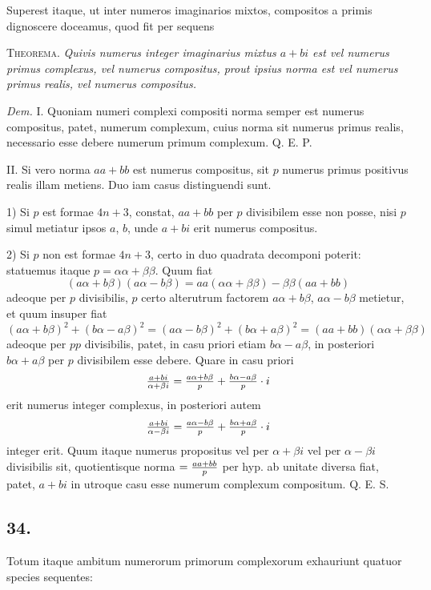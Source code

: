 \documentclass[twoside,12pt]{memoir}
\let\oldfrac\frac
\def\frac#1#2{\mathchoice{\tfrac{#1}{#2}}{\oldfrac{#1}{#2}}{\genfrac{}{}{}{2}{#1}{#2\mathstrut}}{\genfrac{}{}{}{3}{#1}{#2\mathstrut}}}
\begin{document}
Superest itaque, ut inter numeros imaginarios mixtos, compositos a primis dignoscere doceamus, quod fit per sequens
 
\textsc{Theorema.} \textit{Quivis numerus integer imaginarius mixtus \(a+b i\) est vel numerus primus complexus, vel numerus compositus, prout ipsius norma est vel numerus primus realis, vel numerus compositus.}
 
\textit{Dem.} I. Quoniam numeri complexi compositi norma semper est numerus compositus, patet, numerum complexum, cuius norma sit numerus primus realis, necessario esse debere numerum primum complexum. Q. E. P.
 
II. Si vero norma \(a a+b b\) est numerus compositus, sit \(p\) numerus primus positivus realis illam metiens. Duo iam casus distinguendi sunt.
 
1) Si \(p\) est formae \(4 n+3\), constat, \(a a+b b\) per \(p\) divisibilem esse non posse, nisi \(p\) simul metiatur ipsos \(a\), \(b\), unde \(a+b i\) erit numerus compositus.
 
2) Si \(p\) non est formae \(4 n+3\), certo in duo quadrata decomponi poterit: statuemus itaque \(p=\alpha \alpha+\beta \beta\). Quum fiat
\[(a \alpha+b \beta)(a \alpha-b \beta)=a a(\alpha \alpha+\beta \beta)-\beta \beta(a a+b b)\]
adeoque per \(p\) divisibilis, \(p\) certo alterutrum factorem \(a \alpha+b \beta\), \(a \alpha-b \beta\) metietur, et quum insuper fiat
\[(a \alpha+b \beta)^{2}+(b \alpha-a \beta)^{2}=(a \alpha-b \beta)^{2}+(b \alpha+a \beta)^{2}=(a a+b b)(\alpha \alpha+\beta \beta)\]
adeoque per \(p p\) divisibilis, patet, in casu priori etiam \(b \alpha-a \beta\), in posteriori \(b \alpha+a \beta\) per \(p\) divisibilem esse debere. Quare in casu priori
\[\frac{a+b i}{\alpha+\beta i}=\frac{a \alpha+b \beta}{p}+\frac{b \alpha-a \beta}{p} \cdot i\]
erit numerus integer complexus, in posteriori autem
\[\frac{a+b i}{\alpha-\beta i}=\frac{a \alpha-b \beta}{p}+\frac{b \alpha+a \beta}{p} \cdot i\]
integer erit. Quum itaque numerus propositus vel per \(\alpha+\beta i\) vel per \(\alpha-\beta i\) divisibilis sit, quotientisque norma \(=\frac{a a+b b}{p}\) per hyp. ab unitate diversa fiat, patet, \(a+b i\) in utroque casu esse numerum complexum compositum. Q. E. S.\pagebreak%

\subsection*{34.}
 
Totum itaque ambitum numerorum primorum complexorum exhauriunt quatuor species sequentes:
 
\end{document}
